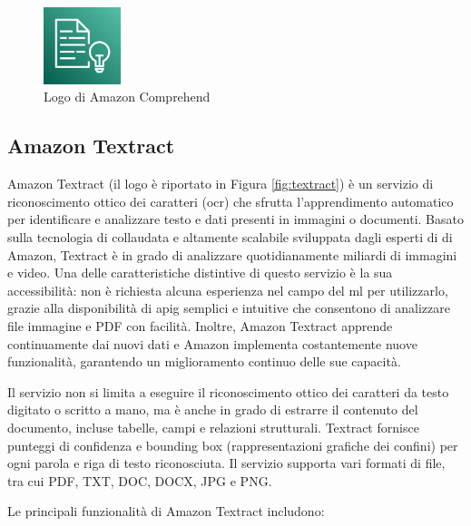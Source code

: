 \begin{figure}[h]
  \centering
  \includegraphics[width=0.2\textwidth]{img/tecnologie/comprehend.png}
  \caption{Logo di Amazon Comprehend}
  \label{fig:comprehend}
\end{figure}

\subsection{Amazon Textract}
Amazon Textract (il logo è riportato in Figura \ref{fig:textract}) è un servizio di riconoscimento ottico dei caratteri (\gls{ocr}) che sfrutta l'apprendimento automatico per identificare e analizzare testo e dati presenti in immagini o documenti. Basato sulla tecnologia di  collaudata e altamente scalabile sviluppata dagli esperti di  di Amazon, Textract è in grado di analizzare quotidianamente miliardi di immagini e video. Una delle caratteristiche distintive di questo servizio è la sua accessibilità: non è richiesta alcuna esperienza nel campo del \gls{ml} per utilizzarlo, grazie alla disponibilità di \gls{apig} semplici e intuitive che consentono di analizzare file immagine e PDF con facilità. Inoltre, Amazon Textract apprende continuamente dai nuovi dati e Amazon implementa costantemente nuove funzionalità, garantendo un miglioramento continuo delle sue capacità.

Il servizio non si limita a eseguire il riconoscimento ottico dei caratteri da testo digitato o scritto a mano, ma è anche in grado di estrarre il contenuto del documento, incluse tabelle, campi e relazioni strutturali. Textract fornisce punteggi di confidenza e bounding box (rappresentazioni grafiche dei confini) per ogni parola e riga di testo riconosciuta. Il servizio supporta vari formati di file, tra cui PDF, TXT, DOC, DOCX, JPG e PNG.

Le principali funzionalità di Amazon Textract includono:

